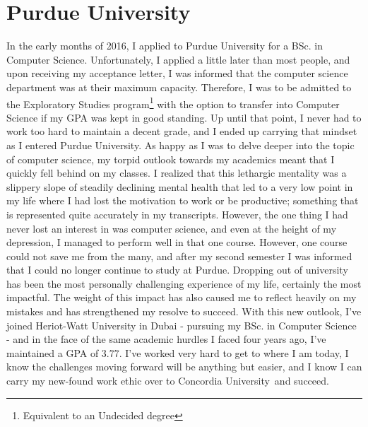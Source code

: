 \documentclass[a4paper,11pt]{article}
\newcommand{\uni}{Concordia University}
\begin{document}
\section*{Purdue University}
In the early months of 2016,  I applied to Purdue University for a BSc. in Computer Science.  Unfortunately, I applied a little later than most people, and upon receiving my acceptance letter, I was informed that the computer science department was at their maximum capacity. Therefore, I was to be admitted to the Exploratory Studies program\footnote{Equivalent to an Undecided degree} with the option to transfer into Computer Science if my GPA was kept in good standing. 
Up until that point, I never had to work too hard to maintain a decent grade, and I ended up carrying that mindset as I entered Purdue University. As happy as I was to delve deeper into the topic of computer science, my torpid outlook towards my academics meant that I quickly fell behind on my classes. I realized that this lethargic mentality was a slippery slope of steadily declining mental health that led to a very low point in my life where I had lost the motivation to work or be productive; something that is represented quite accurately in my transcripts. However, the one thing I had never lost an interest in was computer science, and even at the height of my depression, I managed to perform well in that one course. However, one course could not save me from the many, and after my second semester I was informed that I could no longer continue to study at Purdue.
Dropping out of university has been the most personally challenging experience of my life, certainly the most impactful. The weight of this impact has also caused me to reflect heavily on my mistakes and has strengthened my resolve to succeed. With this new outlook, I've joined Heriot-Watt University in Dubai - pursuing my BSc. in Computer Science - and in the face of the same academic hurdles I faced four years ago, I've maintained a GPA of 3.77. I've worked very hard to get to where I am today, I know the challenges moving forward will be anything but easier, and I know I can carry my new-found work ethic over to \uni\ and succeed.
\end{document}
